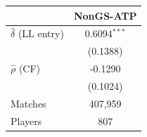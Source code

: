 \begin{tabular}{lc}
\toprule
 & NonGS-ATP \\
\midrule
$\hat{\delta}$ (LL entry) & 0.6094$^{***}$ \\
 & (0.1388) \\
$\hat{\rho}$ (CF) & -0.1290 \\
 & (0.1024) \\
\midrule
Matches & 407,959 \\
Players & 807 \\
\bottomrule
\end{tabular}

